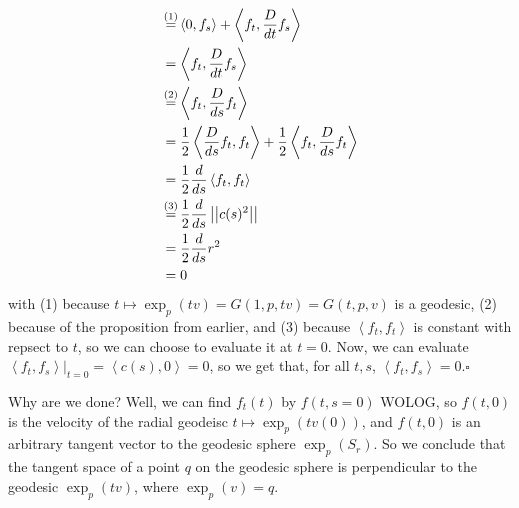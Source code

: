 \documentclass[10pt,letterpaper]{article}
\newcommand{\n}{\hfill\break}
\newcommand{\proven}{\;$\square$\n}
\newcommand{\ptxt}[1]{\textrm{\textnormal{#1}}}
\newcommand{\abs}[1]{\left|#1\right|}
\newcommand{\restr}[1]{\left.#1\right|}
\newcommand{\norm}[1]{\abs{\abs{#1}}}
\newcommand{\iprod}[1]{\left<#1\right>}
\newcommand{\labeledeq}[1]{\overset{\mathclap{\ptxt{#1}}}{=}}
\begin{document}
{\begin{align*}
		& \labeledeq{(1)}\iprod{0,f_{s}}+\iprod{f_{t},\frac{D}{dt}f_{s}}\\
		& =\iprod{f_{t},\frac{D}{dt}f_{s}}\\
		& \labeledeq{(2)}\iprod{f_{t},\frac{D}{ds}f_{t}}\\
		& =\frac{1}{2}\iprod{\frac{D}{ds}f_{t},f_{t}}+\frac{1}{2}\iprod{f_{t},\frac{D}{ds}f_{t}}\\
		& =\frac{1}{2}\frac{d}{ds}\iprod{f_{t},f_{t}}\\
		& \labeledeq{(3)}\frac{1}{2}\frac{d}{ds}\norm{c(s)^{2}}\\
		& =\frac{1}{2}\frac{d}{ds}r^{2}\\
		& =0
	\end{align*}
	with (1) because $t\mapsto\exp_{p}(tv)=G(1,p,tv)=G(t,p,v)$ is a geodesic, (2) because of the proposition from earlier, and (3) because $\iprod{f_{t},f_{t}}$ is constant with repsect to $t$, so we can choose to evaluate it at $t=0$. Now, we can evaluate $\restr{\iprod{f_{t},f_{s}}}_{t=0}=\iprod{c(s),0}=0$, so we get that, for all $t,s$, $\iprod{f_{t},f_{s}}=0$.\proven
}

\par\noindent
Why are we done? Well, we can find $f_{t}(t)$ by $f(t,s=0)$ WOLOG, so $f(t,0)$ is the velocity of the radial geodeisc $t\mapsto\exp_{p}(tv(0))$, and $f(t,0)$ is an arbitrary tangent vector to the geodesic sphere $\exp_{p}(S_{r})$. So we conclude that the tangent space of a point $q$ on the geodesic sphere is perpendicular to the geodesic $\exp_{p}(tv)$, where $\exp_{p}(v)=q$.\newpage
\end{document}

